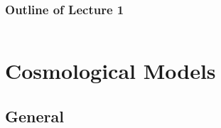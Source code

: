 \documentclass[xcolor=dvipsnames]{beamer}
\begin{document}
\begin{frame}
  \frametitle{Outline of Lecture 1}
  \begin{columns}[t]
	\tableofcontents[sections={1}]
        \vspace{3mm}
	\tableofcontents[sections={2}]
        \vspace{3mm}
	\tableofcontents[sections={3}]
  \end{columns}	
\end{frame}

\section{Cosmological Models}

\subsection{General}
\end{document}
